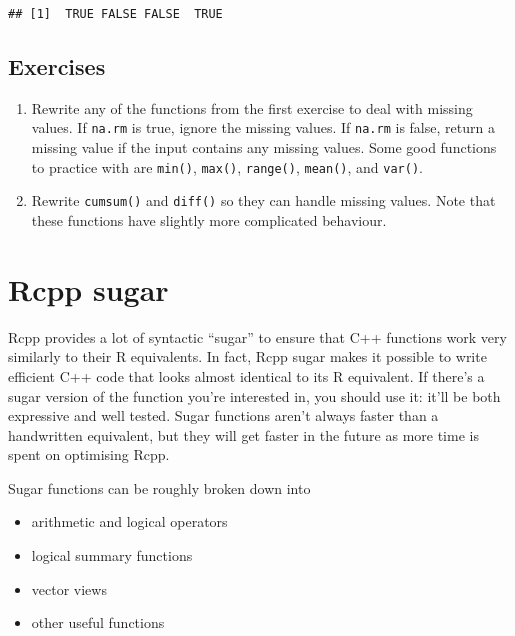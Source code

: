 \begin{verbatim}
## [1]  TRUE FALSE FALSE  TRUE
\end{verbatim}

\hypertarget{exercises-1}{%
\subsection{Exercises}\label{exercises-1}}

\begin{enumerate}
\def\labelenumi{\arabic{enumi}.}
\item
  Rewrite any of the functions from the first exercise to deal with
  missing values. If \texttt{na.rm} is true, ignore the missing values.
  If \texttt{na.rm} is false, return a missing value if the input
  contains any missing values. Some good functions to practice with are
  \texttt{min()}, \texttt{max()}, \texttt{range()}, \texttt{mean()}, and
  \texttt{var()}.
\item
  Rewrite \texttt{cumsum()} and \texttt{diff()} so they can handle
  missing values. Note that these functions have slightly more
  complicated behaviour.
\end{enumerate}

\hypertarget{rcpp-sugar}{%
\section{Rcpp sugar}\label{rcpp-sugar}}

Rcpp provides a lot of syntactic ``sugar'' to ensure that C++ functions
work very similarly to their R equivalents. In fact, Rcpp sugar makes it
possible to write efficient C++ code that looks almost identical to its
R equivalent. If there's a sugar version of the function you're
interested in, you should use it: it'll be both expressive and well
tested. Sugar functions aren't always faster than a handwritten
equivalent, but they will get faster in the future as more time is spent
on optimising Rcpp.

Sugar functions can be roughly broken down into

\begin{itemize}
\tightlist
\item
  arithmetic and logical operators
\item
  logical summary functions
\item
  vector views
\item
  other useful functions
\end{itemize}

